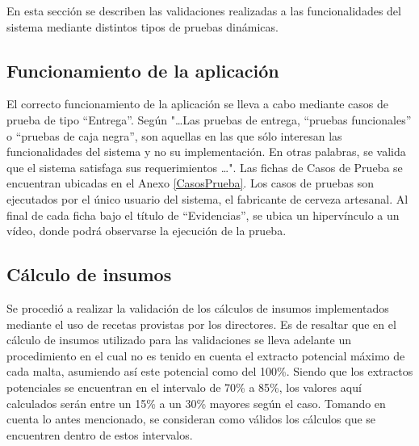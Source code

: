 \par En esta sección se describen las validaciones realizadas a las funcionalidades del sistema mediante distintos tipos de pruebas dinámicas.

\subsection{Funcionamiento de la aplicación}
El correcto funcionamiento de la aplicación se lleva a cabo mediante casos de prueba de tipo ``Entrega''. Según \cite{Som05} "\ldots Las pruebas de entrega, “pruebas funcionales” o “pruebas de caja negra”, son aquellas en las que sólo interesan las funcionalidades del sistema y no su implementación. En otras palabras, se valida que el sistema satisfaga sus requerimientos \ldots".
Las fichas de Casos de Prueba se encuentran ubicadas en el Anexo \ref{CasosPrueba}. Los casos de pruebas son ejecutados por el único usuario del sistema, el fabricante de cerveza artesanal. Al final de cada ficha bajo el título de ``Evidencias'', se ubica un hipervínculo a un vídeo, donde podrá observarse la ejecución de la prueba.

\subsection{Cálculo de insumos}
\par Se procedió a realizar la validación de los cálculos de insumos implementados mediante el uso de recetas provistas por los directores. Es de resaltar que en el cálculo de insumos utilizado para las validaciones se lleva adelante un procedimiento en el cual no es tenido en cuenta el extracto potencial máximo de cada malta, asumiendo así este potencial como del 100\%. Siendo que los extractos potenciales se encuentran en el intervalo de 70\% a 85\%, los valores aquí calculados serán entre un 15\% a un 30\% mayores según el caso. Tomando en cuenta lo antes mencionado, se consideran como válidos los cálculos que se encuentren dentro de estos intervalos.


